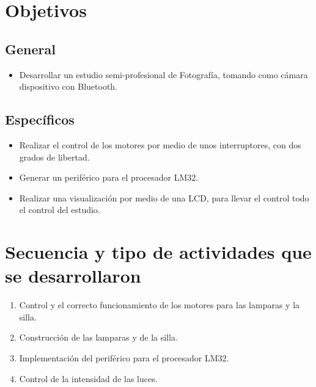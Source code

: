 \documentclass[twocolumn]{IEEEtran}
\begin{document}
\section{Objetivos}
\subsection{General}
\begin{itemize}
 \item Desarrollar un estudio semi-profesional de Fotografía, tomando como cámara dispositivo con Bluetooth.
\end{itemize}

\subsection{Específicos}
\begin{itemize}
 \item Realizar el control de los motores por medio de unos interruptores, con dos grados de libertad.
 \item Generar un periférico para el procesador LM32.
 \item Realizar una visualización por medio de una LCD, para llevar el control todo el control del estudio.
\end{itemize}

\section{Secuencia y tipo de actividades que se desarrollaron}
\noindent
\begin{enumerate}
 \item Control y el correcto funcionamiento de los motores para las lamparas y la silla.
 \item Construcción de las lamparas y de la silla.
 \item Implementación del periférico para el procesador LM32.
 \item Control de la intensidad de las luces.
\end{enumerate}
\end{document}
